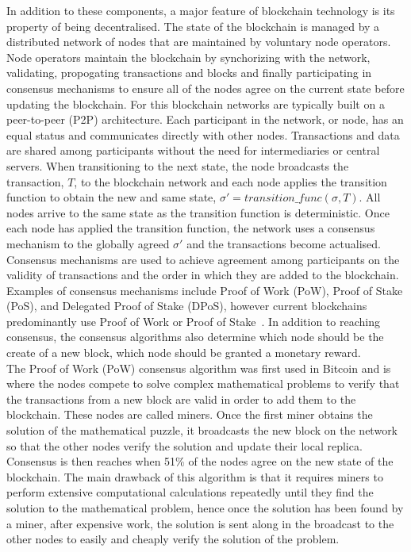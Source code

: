 \noindent In addition to these components, a major feature of blockchain technology is its property of being decentralised. The state of the blockchain is managed by a distributed network of nodes that are maintained by voluntary node operators. Node operators maintain the blockchain by synchorizing with the network, validating, propogating transactions and blocks and finally participating in consensus mechanisms to ensure all of the nodes agree on the current state before updating the blockchain. For this blockchain networks are typically built on a peer-to-peer (P2P) architecture. Each participant in the network, or node, has an equal status and communicates directly with other nodes. Transactions and data are shared among participants without the need for intermediaries or central servers. When transitioning to the next state, the node broadcasts the transaction, $T$, to the blockchain network and each node applies the transition function to obtain the new and same state, $\sigma' = transition\_func(\sigma, T)$. All nodes arrive to the same state as the transition function is deterministic. Once each node has applied the transition function, the network uses a consensus mechanism to the globally agreed $\sigma'$ and the transactions become actualised.
\\[3mm]
Consensus mechanisms are used to achieve agreement among participants on the validity of transactions and the order in which they are added to the blockchain. Examples of consensus mechanisms include Proof of Work (PoW), Proof of Stake (PoS), and Delegated Proof of Stake (DPoS), however current blockchains predominantly use Proof of Work or Proof of Stake~\cite{noauthor_consensus_nodate}. In addition to reaching consensus, the consensus algorithms also determine which node should be the create of a new block, which node should be granted a monetary reward.
\\[3mm]
The Proof of Work (PoW) consensus algorithm was first used in Bitcoin and is where the nodes compete to solve complex mathematical problems to verify that the transactions from a new block are valid in order to add them to the blockchain. These nodes are called miners. Once the first miner obtains the solution of the mathematical puzzle, it broadcasts the new block on the network so that the other nodes verify the solution and update their local replica. Consensus is then reaches when 51\% of the nodes agree on the new state of the blockchain. The main drawback of this algorithm is that it requires miners to perform extensive computational calculations repeatedly until they find the solution to the mathematical problem, hence once the solution has been found by a miner, after expensive work, the solution is sent along in the broadcast to the other nodes to easily and cheaply verify the solution of the problem.
